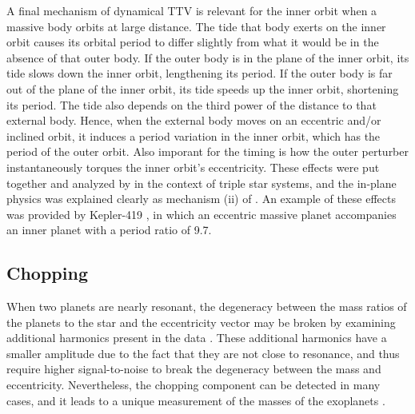 \documentclass[graybox,natbib,nosecnum]{svmult}
\begin{document}
A final mechanism of dynamical TTV is relevant for the inner orbit when a massive body orbits at large distance.  The tide that body exerts on the inner orbit causes its orbital period to differ slightly from what it would be in the absence of that outer body.  If the outer body is in the plane of the inner orbit, its tide slows down the inner orbit, lengthening its period.  If the outer body is far out of the plane of the inner orbit, its tide speeds up the inner orbit, shortening its period.  The tide also depends on the third power of the distance to that external body.  Hence, when the external body moves on an eccentric and/or inclined orbit, it induces a period variation in the inner orbit, which has the period of the outer orbit.  Also imporant for the timing is how the outer perturber instantaneously torques the inner orbit's eccentricity.  These effects were put together and analyzed by \cite{2003A&A...398.1091B} in the context of triple star systems, and the in-plane physics was explained clearly as mechanism (ii) of \cite{2005MNRAS.359..567A}.  An example of these effects was provided by Kepler-419 \citep{2014ApJ...791...89D}, in which an eccentric massive planet accompanies an inner planet with a period ratio of 9.7.

\subsection{Chopping}

When two planets are nearly resonant, the degeneracy between the mass ratios of the planets to the star
and the eccentricity vector may be broken by examining additional harmonics present in the data \citep{2015ApJ...802..116D}.
These additional harmonics have a smaller amplitude due to the fact that they are not close to resonance,
and thus require higher signal-to-noise to break the degeneracy between the mass and eccentricity.
Nevertheless, the chopping component can be detected in many cases, and it leads to a unique measurement
of the masses of the exoplanets \citep{2014ApJ...790...58N,2014ApJ...795..167S,2015ApJ...802..116D}.
\end{document}
